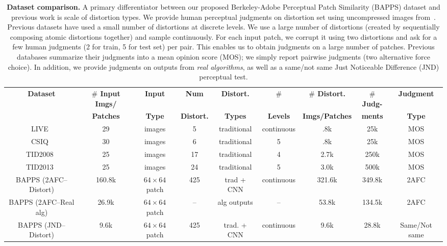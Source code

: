 \begin{table*}[t!]
\begin{center}
\scalebox{0.83} {
\begin{tabular}{ c c c c c c c c c }
\textbf{Dataset} & \textbf{$\#$ Input Imgs/} & \textbf{Input} & \textbf{Num} & \textbf{Distort.} & \textbf{$\#$} & \textbf{$\#$ Distort.} & \textbf{$\#$ Judg-} & \textbf{Judgment} \\ 
& \textbf{Patches} & \textbf{Type} & \textbf{Distort.} & \textbf{Types} & \textbf{Levels} & \textbf{Imgs/Patches} & \textbf{ments} & \textbf{Type} \\
\toprule
LIVE~\cite{sheikh2006statistical} & 29 & images & 5 & traditional & continuous & .8k & 25k & MOS \\ %
CSIQ~\cite{larson2010most} & 30 & images & 6 & traditional & 5 & .8k & 25k & MOS \\ %
TID2008~\cite{ponomarenko2009tid2008} & 25 & images & 17 & traditional & 4 & 2.7k & 250k & MOS \\
TID2013~\cite{ponomarenko2015image} & 25 & images & 24 & traditional & 5 & 3.0k & 500k & MOS \\ 
\midrule
BAPPS (2AFC--Distort) & 160.8k & $64\times 64$ patch & 425 & trad + CNN & continuous & 321.6k & 349.8k & 2AFC \\
BAPPS (2AFC--Real alg) & 26.9k & $64\times 64$ patch & -- & alg outputs & -- & 53.8k & 134.5k & 2AFC  \\ \hdashline 
BAPPS (JND--Distort) & 9.6k & $64\times 64$ patch & 425 & trad. + CNN & continuous & 9.6k & 28.8k & Same/Not same  \\ 

\bottomrule
\end{tabular}
}
\vspace{5px}
\vspace{-2mm}
\caption{\textbf{Dataset comparison.} A primary differentiator between our proposed Berkeley-Adobe Perceptual Patch Similarity (BAPPS) dataset and previous work is scale of distortion types. We provide human perceptual judgments on distortion set using uncompressed images from~\cite{fivek,dang2015raise}. Previous datasets have used a small number of distortions at discrete levels. We use a large number of distortions (created by sequentially composing atomic distortions together) and sample continuously. For each input patch, we corrupt it using two distortions and ask for a few human judgments (2 for train, 5 for test set) per pair. This enables us to obtain judgments on a large number of patches. Previous databases summarize their judgments into a mean opinion score (MOS); we simply report pairwise judgments (two alternative force choice). In addition, we provide judgments on outputs from \textit{real algorithms}, as well as a same/not same Just Noticeable Difference (JND) perceptual test.
\vspace{-8mm}
}
\label{tab:dataset_comp}
\end{center}
\end{table*}

